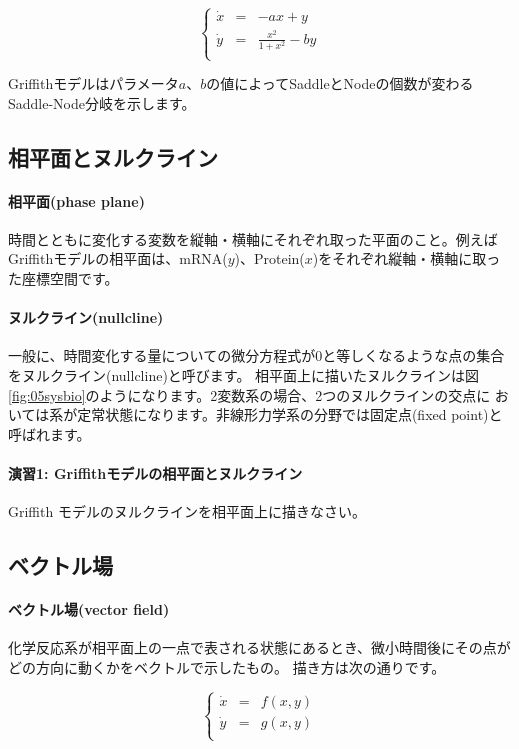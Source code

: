 \[
\left\{
\begin{array}{lclclll}
\dot x & = & -ax + y\\
\dot y & = & \displaystyle\frac{x^2}{1+x^2} - by\\
\end{array}
\right.\]

Griffithモデルはパラメータ\(a\)、\(b\)の値によってSaddleとNodeの個数が変わるSaddle-Node分岐を示します。

\subsection{相平面とヌルクライン}
\paragraph{相平面(phase plane)}
時間とともに変化する変数を縦軸・横軸にそれぞれ取った平面のこと。例えばGriffithモデルの相平面は、mRNA(\(y\))、Protein(\(x\))をそれぞれ縦軸・横軸に取った座標空間です。

\paragraph{ヌルクライン(nullcline)} 一般に、時間変化する量についての微分方程式が0と等しくなるような点の集合をヌルクライン(nullcline)と呼びます。
相平面上に描いたヌルクラインは図\ref{fig:05sysbio}のようになります。2変数系の場合、2つのヌルクラインの交点に
おいては系が定常状態になります。非線形力学系の分野では固定点(fixed point)と呼ばれます。

\paragraph{演習1:  Griffithモデルの相平面とヌルクライン}
Griffith モデルのヌルクラインを相平面上に描きなさい。

\subsection{ベクトル場}
\paragraph{ベクトル場(vector field)}
化学反応系が相平面上の一点で表される状態にあるとき、微小時間後にその点がどの方向に動くかをベクトルで示したもの。
描き方は次の通りです。

\[
\left\{
\begin{array}{lclclll}
\dot x & = & f(x,y)\\
\dot y & = & g(x,y)\\
\end{array}
\right.\]

